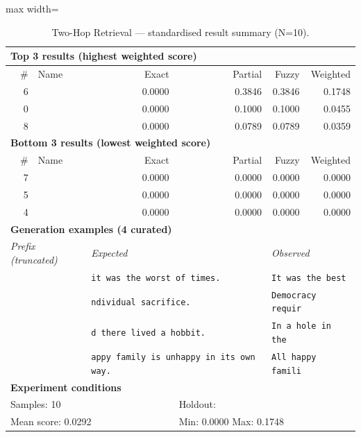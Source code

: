 \begin{table}[htbp]
\centering
\caption{Two-Hop Retrieval — standardised result summary (N=10).}
\label{tab:two-hop_retrieval_summary}
\begin{adjustbox}{max width=\textwidth}
\begin{tabular}{r p{5cm} r r r r}
\toprule
\multicolumn{6}{l}{\textbf{Top 3 results (highest weighted score)}} \\
\midrule
\# & Name & Exact & Partial & Fuzzy & Weighted \\
\midrule
6 &  & 0.0000 & 0.3846 & 0.3846 & 0.1748 \\
0 &  & 0.0000 & 0.1000 & 0.1000 & 0.0455 \\
8 &  & 0.0000 & 0.0789 & 0.0789 & 0.0359 \\
\midrule
\multicolumn{6}{l}{\textbf{Bottom 3 results (lowest weighted score)}} \\
\midrule
\# & Name & Exact & Partial & Fuzzy & Weighted \\
\midrule
7 &  & 0.0000 & 0.0000 & 0.0000 & 0.0000 \\
5 &  & 0.0000 & 0.0000 & 0.0000 & 0.0000 \\
4 &  & 0.0000 & 0.0000 & 0.0000 & 0.0000 \\
\midrule
\multicolumn{6}{l}{\textbf{Generation examples (4 curated)}} \\
\midrule
\multicolumn{2}{l}{\textit{Prefix (truncated)}} & \multicolumn{2}{l}{\textit{Expected}} & \multicolumn{2}{l}{\textit{Observed}} \\
\midrule
\multicolumn{2}{l}{\texttt{}} & \multicolumn{2}{l}{\texttt{it was the worst of times.}} & \multicolumn{2}{l}{\texttt{It was the best}} \\
\multicolumn{2}{l}{\texttt{}} & \multicolumn{2}{l}{\texttt{ndividual sacrifice.}} & \multicolumn{2}{l}{\texttt{Democracy requir}} \\
\multicolumn{2}{l}{\texttt{}} & \multicolumn{2}{l}{\texttt{d there lived a hobbit.}} & \multicolumn{2}{l}{\texttt{In a hole in the}} \\
\multicolumn{2}{l}{\texttt{}} & \multicolumn{2}{l}{\texttt{appy family is unhappy in its own way.}} & \multicolumn{2}{l}{\texttt{All happy famili}} \\
\midrule
\multicolumn{6}{l}{\textbf{Experiment conditions}} \\
\midrule
\multicolumn{3}{l}{Samples: 10} & \multicolumn{3}{l}{Holdout: } \\
\multicolumn{3}{l}{Mean score: 0.0292} & \multicolumn{3}{l}{Min: 0.0000 \quad Max: 0.1748} \\

\end{tabular}
\end{adjustbox}
\end{table}
